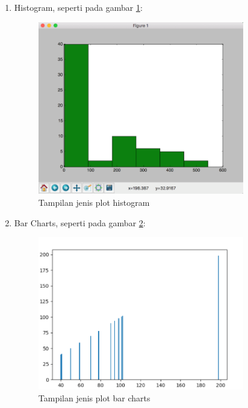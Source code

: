 \begin{enumerate}
\item Histogram, seperti pada gambar \ref{fig:histogrm}:
\begin{figure}[!htbp]
	\centerline{\includegraphics[width=0.85\textwidth]{figures/6/histogrm.PNG}}
	\caption{Tampilan jenis plot histogram}
	\label{fig:histogrm}
\end{figure}

\item Bar Charts, seperti pada gambar \ref{fig:barchart}:
\begin{figure}[!htbp]
	\centerline{\includegraphics[width=0.85\textwidth]{figures/6/barchart.PNG}}
	\caption{Tampilan jenis plot bar charts}
	\label{fig:barchart}
\end{figure}


\end{enumerate}
